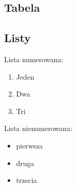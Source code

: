 \subsection{Tabela}



\subsection{Listy}


Lista numerowana:
\begin{enumerate}
  \item Jeden
  \item Dwa
  \item Tri
\end{enumerate}

Lista nienumerowana:
\begin{itemize}
  \item pierwsza
  \item druga
  \item trzecia
\end{itemize}